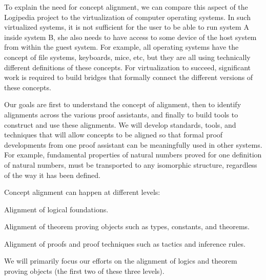 To explain the need for concept alignment, we can compare this aspect
of the Logipedia project to the virtualization of computer operating
systems. In such virtualized systems, it is not sufficient for the
user to be able to run system A inside system B, she also needs to
have access to some device of the host system from within the guest
system. For example, all operating systems have the concept of file
systems, keyboards, mice, etc, but they are all using technically
different definitions of these concepts.  For virtualization to
succeed, significant work is required to build bridges that formally
connect the different versions of these concepts.

Our goals are first to understand the concept of alignment, then to
identify alignments across the various proof assistants, and finally
to build tools to construct and use these alignments. We will develop
standards, tools, and techniques that will allow concepts to be
aligned so that formal proof developments from one proof assistant can
be meaningfully used in other systems. For example, fundamental
properties of natural numbers proved for one definition of natural
numbers, must be transported to any isomorphic structure, regardless
of the way it has been defined.

Concept alignment can happen at different levels:
\begin{compactitem}
\item Alignment of logical foundations.
\item Alignment of theorem proving objects such as types,
  constants, and theorems.
\item Alignment of proofs and proof techniques such as tactics and
  inference rules.
\end{compactitem}
We will primarily focus our efforts on the alignment of
logics and theorem proving objects (the first two of these three levels).

\newcommand{\parag}[1]{\medskip \noindent {\bf #1}}

